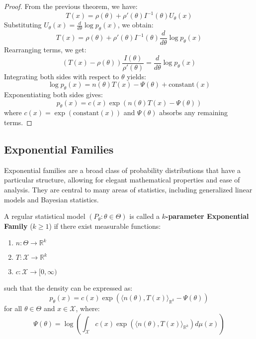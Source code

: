 \documentclass[open=any, 11pt,paper=A4]{scrreprt}
\begin{document}
\begin{proof}
    From the previous theorem, we have:
    \[
    T(x) = \rho(\theta) + \rho'(\theta) I^{-1}(\theta) U_\theta(x)
    \]
    Substituting \(U_\theta(x) = \frac{d}{d\theta} \log p_\theta(x)\), we obtain:
    \[
    T(x) = \rho(\theta) + \rho'(\theta) I^{-1}(\theta) \frac{d}{d\theta} \log p_\theta(x)
    \]
    Rearranging terms, we get:
    \[
    \left( T(x) - \rho(\theta) \right) \frac{I(\theta)}{\rho'(\theta)} = \frac{d}{d\theta} \log p_\theta(x)
    \]
    Integrating both sides with respect to \(\theta\) yields:
    \[
    \log p_\theta(x) = n(\theta) T(x) - \Psi(\theta) + \text{constant}(x)
    \]
    Exponentiating both sides gives:
    \[
    p_\theta(x) = c(x) \exp\left( n(\theta) T(x) - \Psi(\theta) \right)
    \]
    where \(c(x) = \exp(\text{constant}(x))\) and \(\Psi(\theta)\) absorbs any remaining terms.
\end{proof}

\subsection*{Exponential Families}

Exponential families are a broad class of probability distributions that have a particular structure, allowing for elegant mathematical properties and ease of analysis. They are central to many areas of statistics, including generalized linear models and Bayesian statistics.

\begin{definition}
    A regular statistical model \((P_\theta : \theta \in \Theta)\) is called a \textbf{$k$-parameter Exponential Family} (\(k \geq 1\)) if there exist measurable functions:
    \begin{enumerate}
        \item \(n: \Theta \to \mathbb{R}^k\)
        \item \(T: \mathcal{X} \to \mathbb{R}^k\)
        \item \(c: \mathcal{X} \to [0, \infty)\)
    \end{enumerate}
    such that the density can be expressed as:
    \[
    p_\theta(x) = c(x) \exp\left( \langle n(\theta), T(x) \rangle_{\mathbb{R}^k} - \Psi(\theta) \right)
    \]
    for all \(\theta \in \Theta\) and \(x \in \mathcal{X}\), where:
    \[
    \Psi(\theta) = \log \left( \int_{\mathcal{X}} c(x) \exp\left( \langle n(\theta), T(x) \rangle_{\mathbb{R}^k} \right) d\mu(x) \right)
    \]
\end{definition}
\end{document}
